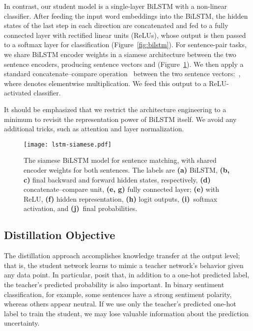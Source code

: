 \documentclass[11pt,a4paper]{article}
\newcommand\caplbl[1]{\textbf{(#1)}}
\begin{document}
In contrast, our student model is a single-layer BiLSTM with a non-linear classifier. After feeding the input word embeddings into the BiLSTM, the hidden states of the last step in each direction are concatenated and fed to a fully connected layer with rectified linear units (ReLUs), whose output is then passed to a softmax layer for classification (Figure~\ref{fig:bilstm}). For sentence-pair tasks, we share BiLSTM encoder weights in a siamese architecture between the two sentence encoders, producing sentence vectors  and  (Figure~\ref{fig:bilstmsiamese}). We then apply a standard concatenate--compare operation~\cite{wang2018glue} between the two sentence vectors:~, where  denotes elementwise multiplication. We feed this output to a ReLU-activated classifier.

It should be emphasized that we restrict the architecture engineering to a minimum to revisit the representation power of BiLSTM itself. We avoid any additional tricks, such as attention and layer normalization. 





\begin{figure}
    \centering
    \texttt{[image: lstm-siamese.pdf]}
    \caption{The siamese BiLSTM model for sentence matching, with shared encoder weights for both sentences. The labels are \caplbl{a} BiLSTM, \caplbl{b, c} final backward and forward hidden states, respectively, \caplbl{d} concatenate--compare unit, \caplbl{e, g} fully connected layer; \caplbl{e} with ReLU, \caplbl{f} hidden representation, \caplbl{h} logit outputs, \caplbl{i}~softmax activation, and \caplbl{j}~final probabilities.}
    \label{fig:bilstmsiamese}
\end{figure}
\subsection{Distillation Objective}\label{sec:distillation-obj}

The distillation approach accomplishes knowledge transfer at the output level; that is, the student network learns to mimic a teacher network's behavior given any data point. In particular, \citet{ba2014deep} posit that, in addition to a one-hot predicted label, the teacher's predicted probability is also important. In binary sentiment classification, for example, some sentences have a strong sentiment polarity, whereas others appear neutral. If we use only the teacher's predicted one-hot label to train the student, we may lose valuable information about the prediction uncertainty.
\end{document}
